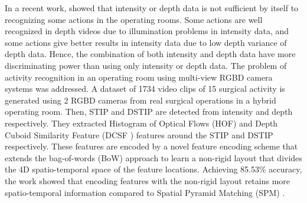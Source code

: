     In a recent work, \citet{twinanda2015data} showed that intensity or depth data is not sufficient by itself to recognizing some actions in the operating rooms. Some actions are well recognized in depth videos due to illumination problems in intensity data, and some actions give better results in intensity data due to low depth variance of depth data. Hence, the combination of both intensity and depth data have more discriminating power than using only intensity or depth data. The problem of activity recognition in an operating room using multi-view RGBD camera systems was addressed. A dataset of 1734 video clips of 15 surgical activity is generated using 2 RGBD cameras from real surgical operations in a hybrid operating room. Then, STIP \cite{1570899} and DSTIP \cite{6619209} are detected from intensity and depth respectively. They extracted Histogram of Optical Flows (HOF) and Depth Cuboid Similarity Feature (DCSF \cite{6619209}) features around the STIP and DSTIP respectively. These features are encoded by a novel feature encoding scheme that extends the bag-of-words (BoW) approach to learn a non-rigid layout that divides the 4D spatio-temporal space of the feature locations. Achieving 85.53\% accuracy, the work showed that encoding features with the non-rigid layout retains more spatio-temporal information compared to Spatial Pyramid Matching (SPM) \cite{1641019}.


